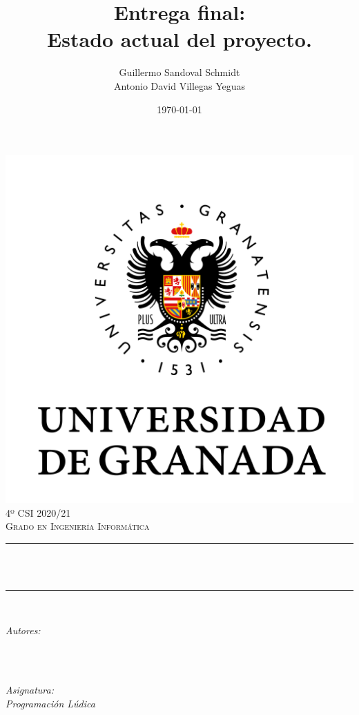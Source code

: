 \documentclass[12pt, spanish]{article}
\title{Entrega final:\\
Estado actual del proyecto.\hspace{0.05cm} }
\author{Guillermo Sandoval Schmidt\\ Antonio David Villegas Yeguas}
\date{\today}
\makeatletter
\let\thetitle\@title
\let\theauthor\@author
\makeatother
\begin{document}

\begin{titlepage}
    \centering
    \vspace*{0.3 cm}
    \includegraphics[scale = 0.50]{ugr.png}\\[0.7 cm]
    \textsc{\large 4º CSI 2020/21}\\[0.5 cm]
    \textsc{\large Grado en Ingeniería Informática}\\[0.5 cm]
    \rule{\linewidth}{0.2 mm} \\[0.2 cm]
    { \huge \bfseries \thetitle}\\
    \rule{\linewidth}{0.2 mm} \\[1 cm]

    \begin{minipage}{0.4\textwidth}
        \begin{flushleft} \large
            \emph{Autores:}\\
            \theauthor\\
            \end{flushleft}
            \end{minipage}~
            \begin{minipage}{0.4\textwidth}
            \begin{flushright} \large
            \emph{Asignatura: \\
            Programación Lúdica}   \\
        \end{flushright}
    \end{minipage}\\[0.5cm]


\end{titlepage}
\end{document}
